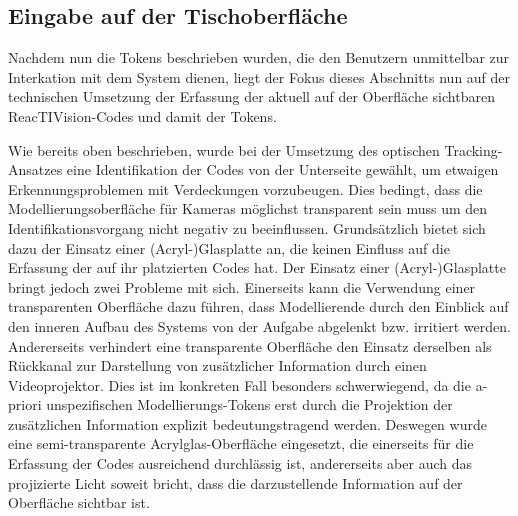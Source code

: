 
\subsection{Eingabe auf der Tischoberfläche} %
\label{sub:input_auf_der_tischoberfläche}

Nachdem nun die Tokens beschrieben wurden, die den Benutzern unmittelbar zur Interkation mit dem System dienen, liegt der Fokus dieses Abschnitts nun auf der technischen Umsetzung der Erfassung der aktuell auf der Oberfläche sichtbaren ReacTIVision-Codes und damit der Tokens.

Wie bereits oben beschrieben, wurde bei der Umsetzung des optischen Tracking-Ansatzes eine Identifikation der Codes von der Unterseite gewählt, um etwaigen Erkennungsproblemen mit Verdeckungen vorzubeugen. Dies bedingt, dass die Modellierungsoberfläche für Kameras möglichst transparent sein muss um den Identifikationsvorgang nicht negativ zu beeinflussen. Grundsätzlich bietet sich dazu der Einsatz einer (Acryl-)Glasplatte an, die keinen Einfluss auf die Erfassung der auf ihr platzierten Codes hat. Der Einsatz einer (Acryl-)Glasplatte bringt jedoch zwei Probleme mit sich. Einerseits kann die Verwendung einer transparenten Oberfläche dazu führen, dass Modellierende durch den Einblick auf den inneren Aufbau des Systems von der Aufgabe abgelenkt bzw. irritiert werden. Andererseits verhindert eine transparente Oberfläche den Einsatz derselben als Rückkanal zur Darstellung von zusätzlicher Information durch einen Videoprojektor. Dies ist im konkreten Fall besonders schwerwiegend, da die a-priori unspezifischen Modellierungs-Tokens erst durch die Projektion der zusätzlichen Information explizit bedeutungstragend werden. Deswegen wurde eine semi-transparente Acrylglas-Oberfläche eingesetzt, die einerseits für die Erfassung der Codes ausreichend durchlässig ist, andererseits aber auch das projizierte Licht soweit bricht, dass die darzustellende Information auf der Oberfläche sichtbar ist.

